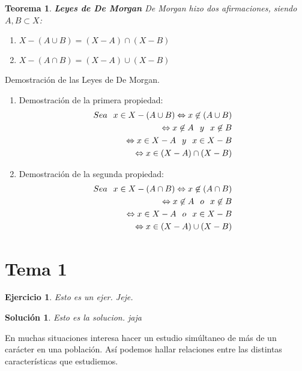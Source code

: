\documentclass[10pt, a4paper]{article}
\makeatletter
\newenvironment{nlist}
{\begin{enumerate}
    \renewcommand\labelenumi{(\emph{\roman{enumi})}}}
  {\end{enumerate}}
\renewenvironment{proof}[1][\proofname] {\par\pushQED{\qed}\normalfont\topsep6\p@\@plus6\p@\relax\trivlist\item[\hskip\labelsep\itshape\sffamily#1\@addpunct{.}]\ignorespaces}{\popQED\endtrivlist\@endpefalse}
\theoremstyle{theorem-style}
\newtheorem{nth}{Teorema}[section]
\theoremstyle{definition-style}
\theoremstyle{remark-style}
\theoremstyle{example-style}
\theoremstyle{definition-style}
\newtheorem{ejer}{Ejercicio}[section]
\theoremstyle{remark-style}
\newtheorem*{sol}{Solución}
\makeatother
\begin{document}
\begin{nth}
\textbf{Leyes de De Morgan}
De Morgan hizo dos afirmaciones, siendo $A,B\subset X$:
\begin{nlist}
\item $X-(A\cup B) = (X-A)\cap(X-B)$
\item $X-(A\cap B)= (X-A)\cup(X-B)$
\end{nlist}
\end{nth}
\begin{proof}Demostración de las Leyes de De Morgan.
\begin{nlist} 
\item Demostración de la primera propiedad:
\begin{equation}
\begin{split}
Sea\hspace{0.25cm}x\in X-(A\cup B) \Leftrightarrow x\not\in (A\cup B)\\
\Leftrightarrow x\not\in A \hspace{0.25cm}y\hspace{0.25cm} x\not\in B \\
\Leftrightarrow x\in X-A \hspace{0.25cm}y\hspace{0.25cm} x\in X-B \\
\Leftrightarrow x\in(X-A)\cap(X-B)
\end{split}
\end{equation}
\item Demostración de la segunda propiedad:
\begin{equation}
\begin{split}
Sea\hspace{0.25cm}x\in X-(A\cap B) \Leftrightarrow x\not\in (A\cap B)\\
\Leftrightarrow x\not\in A \hspace{0.25cm}o\hspace{0.25cm} x\not\in B \\
\Leftrightarrow x\in X-A \hspace{0.25cm}o\hspace{0.25cm} x\in X-B \\
\Leftrightarrow x\in(X-A)\cup(X-B)
\end{split}
\end{equation}
\end{nlist}
\end{proof}




\pagebreak

\section{Tema 1}

\begin{ejer}
Esto es un ejer.
Jeje.
\end{ejer}
\begin{sol}
Esto es la solucion.
jaja
\end{sol}
En muchas situaciones interesa hacer un estudio simúltaneo de más de un
carácter en una población. Así podemos hallar relaciones entre las distintas
características que estudiemos.
\end{document}
